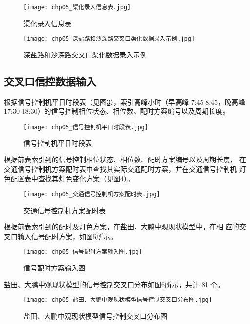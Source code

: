 \begin{figure}[!ht]
  \centering
  \texttt{[image: chp05\_渠化录入信息表.jpg]}
  \caption{渠化录入信息表\label{fig:chp05_渠化录入信息表} }
\end{figure}

\begin{figure}[!ht]
  \centering
  \texttt{[image: chp05\_深盐路和沙深路交叉口渠化数据录入示例.jpg]}
  \caption{深盐路和沙深路交叉口渠化数据录入示例\label{fig:chp05_深盐路和沙深路交叉口渠化数据录入示例} }
\end{figure}

\subsection{交叉口信控数据输入}
根据信号控制机平日时段表（见图\ref{fig:chp05_信号控制机平日时段表}），索引高峰小时（早高峰 7:45-8:45，晚高峰
17:30-18:30）的信号控制相位状态、相位数、配时方案编号以及周期长度。

\begin{figure}[!ht]
  \centering
  \texttt{[image: chp05\_信号控制机平日时段表.jpg]}
  \caption{信号控制机平日时段表\label{fig:chp05_信号控制机平日时段表} }
\end{figure}

根据前表索引到的信号控制相位状态、相位数、配时方案编号以及周期长度，
在交通信号控制机方案配时表中查找其实际交通配时方案，并在交通信号控制机
灯色配置表中查找其灯色变化方案（见图\ref{fig:chp05_交通信号控制机方案配时表}）。

\begin{figure}[!ht]
  \centering
  \texttt{[image: chp05\_交通信号控制机方案配时表.jpg]}
  \caption{交通信号控制机方案配时表\label{fig:chp05_交通信号控制机方案配时表} }
\end{figure}

根据前表索引到的配时及灯色方案，在盐田、大鹏中观现状模型中，在相
应的交叉口输入信号配时方案，如图\ref{fig:chp05_信号配时方案输入图}所示。

\begin{figure}[!ht]
  \centering
  \texttt{[image: chp05\_信号配时方案输入图.jpg]}
  \caption{信号配时方案输入图\label{fig:chp05_信号配时方案输入图} }
\end{figure}

盐田、大鹏中观现状模型的信号控制交叉口分布如图\ref{fig:chp05_盐田大鹏中观现状模型信号控制交叉口分布图}所示，共计 81 个。

\begin{figure}[!ht]
  \centering
  \texttt{[image: chp05\_盐田、大鹏中观现状模型信号控制交叉口分布图.jpg]}
  \caption{盐田、大鹏中观现状模型信号控制交叉口分布图\label{fig:chp05_盐田大鹏中观现状模型信号控制交叉口分布图} }
\end{figure}


